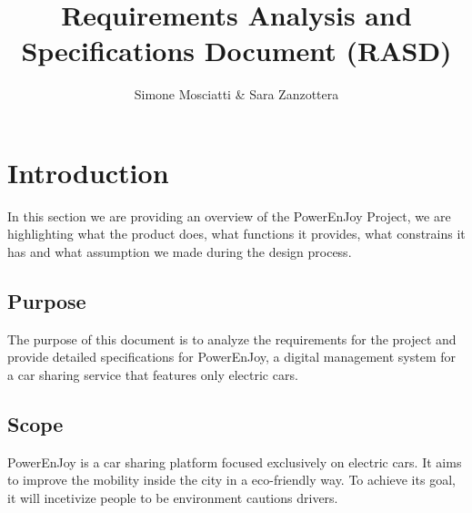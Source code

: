 \documentclass[11pt]{article} %
\title{Requirements Analysis and Specifications Document (RASD)}
\author{Simone Mosciatti \& Sara Zanzottera}
\newcommand{\pe}{PowerEnJoy }
\newcommand{\pecomma}{PowerEnJoy, }
\begin{document}
\maketitle
\newpage
\tableofcontents
\newpage


\section{Introduction}

In this section we are providing an overview of the \pe Project, we are highlighting what the product does, what functions it provides, what constrains it has and what assumption we made during the design process.

  \subsection{Purpose}
  
The purpose of this document is to analyze the requirements for the project and provide detailed specifications for \pecomma a digital management system for a car sharing service that features only electric cars.
  
  \subsection{Scope}
  
\pe is a car sharing platform focused exclusively on electric cars. It aims to improve the mobility inside the city in a eco-friendly way. To achieve its goal, it will incetivize people to be environment cautions drivers.
\end{document}
